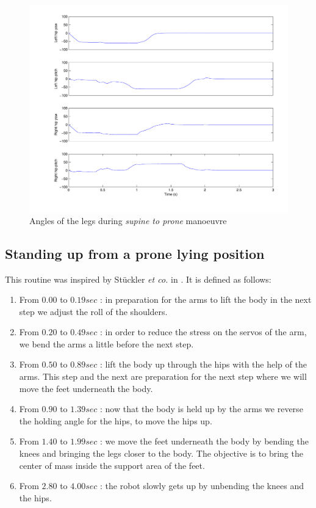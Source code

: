 \begin{figure}[htp]
\center
    \includegraphics[width = \textwidth]{figures/sup2proneLegs}
    \caption[Angles of the legs during \emph{supine to prone} manoeuvre]{Angles of the legs during \emph{supine to prone} manoeuvre}
    \label{fig:sup2proneLegs}
\end{figure}

\subsection{Standing up from a prone lying position}
This routine was inspired by Stückler \emph{et co.} in \cite{Stuckler06}. It is defined as follows:\begin{enumerate}
\item From $0.00$ to $0.19sec$ : in preparation for the arms to lift the body in the next step we adjust the roll of the shoulders.

\item From $0.20$ to $0.49sec$ : in order to reduce the stress on the servos of the arm, we bend the arms a little before the next step.

\item From $0.50$ to $0.89sec$ : lift the body up through the hips with the help of the arms. This step and the next are preparation for the next step where we will move the feet underneath the body.

\item From $0.90$ to $1.39sec$ : now that the body is held up by the arms we reverse the holding angle for the hips, to move the hips up. 

\item From $1.40$ to $1.99sec$ :  we move the feet underneath the body by bending the knees and bringing the legs closer to the body. The objective is to bring the center of mass inside the support area of the feet.

\item From $2.80$ to $4.00sec$ : the robot slowly gets up by unbending the knees and the hips. 
\end{enumerate}

